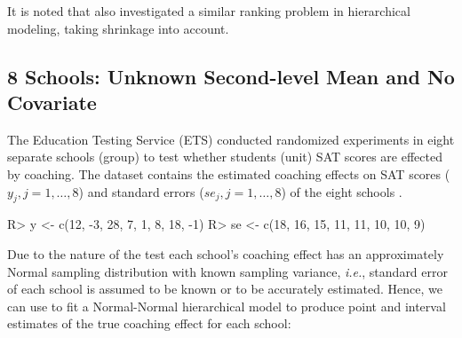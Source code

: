 \documentclass[article]{jss}
\begin{document}


It is noted that \cite{1995} also investigated a similar ranking problem in hierarchical modeling, taking shrinkage into account.


\subsection[Unknown Second-level Mean and No Covariate]{8 Schools: Unknown Second-level Mean and No Covariate}

The Education Testing Service (ETS) conducted randomized experiments in eight separate schools (group) to test whether students (unit) SAT scores are effected by coaching. The dataset contains the estimated coaching effects on SAT scores ($y_{j}, j=1, \ldots, 8$) and standard errors ($se_{j}, j=1, \ldots, 8$) of the eight schools \citep{1981}.
\begin{CodeChunk}
\begin{CodeInput}
R> y  <- c(12, -3, 28,  7,  1,  8, 18, -1)
R> se <- c(18, 16, 15, 11, 11, 10, 10,  9)
\end{CodeInput}
\end{CodeChunk}

Due to the nature of the test each school's coaching effect has an approximately Normal sampling distribution with known sampling variance, \emph{i.e.}, standard error of each school is assumed to be known or to be accurately estimated. Hence, we can use  to fit a Normal-Normal hierarchical model to produce point and interval estimates of the true coaching effect for each school:
\end{document}
